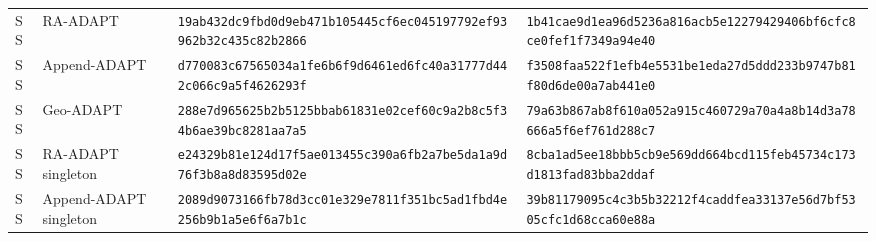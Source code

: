 \documentclass[10pt,letterpaper]{article}
\begin{document}
\begin{longtable}{@{}llp{2.55in}p{2.55in}@{}}
SS & RA-ADAPT & \texttt{19ab432d}\allowbreak{}\texttt{c9fbd0d9}\allowbreak{}\texttt{eb471b10}\allowbreak{}\texttt{5445cf6e}\allowbreak{}\texttt{c0451977}\allowbreak{}\texttt{92ef9396}\allowbreak{}\texttt{2b32c435}\allowbreak{}\texttt{c82b2866}\allowbreak{} & \texttt{1b41cae9}\allowbreak{}\texttt{d1ea96d5}\allowbreak{}\texttt{236a816a}\allowbreak{}\texttt{cb5e1227}\allowbreak{}\texttt{9429406b}\allowbreak{}\texttt{f6cfc8ce}\allowbreak{}\texttt{0fef1f73}\allowbreak{}\texttt{49a94e40}\allowbreak{} \\
SS & Append-ADAPT & \texttt{d770083c}\allowbreak{}\texttt{67565034}\allowbreak{}\texttt{a1fe6b6f}\allowbreak{}\texttt{9d6461ed}\allowbreak{}\texttt{6fc40a31}\allowbreak{}\texttt{777d442c}\allowbreak{}\texttt{066c9a5f}\allowbreak{}\texttt{4626293f}\allowbreak{} & \texttt{f3508faa}\allowbreak{}\texttt{522f1efb}\allowbreak{}\texttt{4e5531be}\allowbreak{}\texttt{1eda27d5}\allowbreak{}\texttt{ddd233b9}\allowbreak{}\texttt{747b81f8}\allowbreak{}\texttt{0d6de00a}\allowbreak{}\texttt{7ab441e0}\allowbreak{} \\
SS & Geo-ADAPT & \texttt{288e7d96}\allowbreak{}\texttt{5625b2b5}\allowbreak{}\texttt{125bbab6}\allowbreak{}\texttt{1831e02c}\allowbreak{}\texttt{ef60c9a2}\allowbreak{}\texttt{b8c5f34b}\allowbreak{}\texttt{6ae39bc8}\allowbreak{}\texttt{281aa7a5}\allowbreak{} & \texttt{79a63b86}\allowbreak{}\texttt{7ab8f610}\allowbreak{}\texttt{a052a915}\allowbreak{}\texttt{c460729a}\allowbreak{}\texttt{70a4a8b1}\allowbreak{}\texttt{4d3a7866}\allowbreak{}\texttt{6a5f6ef7}\allowbreak{}\texttt{61d288c7}\allowbreak{} \\
SS & RA-ADAPT singleton & \texttt{e24329b8}\allowbreak{}\texttt{1e124d17}\allowbreak{}\texttt{f5ae0134}\allowbreak{}\texttt{55c390a6}\allowbreak{}\texttt{fb2a7be5}\allowbreak{}\texttt{da1a9d76}\allowbreak{}\texttt{f3b8a8d8}\allowbreak{}\texttt{3595d02e}\allowbreak{} & \texttt{8cba1ad5}\allowbreak{}\texttt{ee18bbb5}\allowbreak{}\texttt{cb9e569d}\allowbreak{}\texttt{d664bcd1}\allowbreak{}\texttt{15feb457}\allowbreak{}\texttt{34c173d1}\allowbreak{}\texttt{813fad83}\allowbreak{}\texttt{bba2ddaf}\allowbreak{} \\
SS & Append-ADAPT singleton & \texttt{2089d907}\allowbreak{}\texttt{3166fb78}\allowbreak{}\texttt{d3cc01e3}\allowbreak{}\texttt{29e7811f}\allowbreak{}\texttt{351bc5ad}\allowbreak{}\texttt{1fbd4e25}\allowbreak{}\texttt{6b9b1a5e}\allowbreak{}\texttt{6f6a7b1c}\allowbreak{} & \texttt{39b81179}\allowbreak{}\texttt{095c4c3b}\allowbreak{}\texttt{5b32212f}\allowbreak{}\texttt{4caddfea}\allowbreak{}\texttt{33137e56}\allowbreak{}\texttt{d7bf5305}\allowbreak{}\texttt{cfc1d68c}\allowbreak{}\texttt{ca60e88a}\allowbreak{} \\

\end{longtable}
\end{document}
